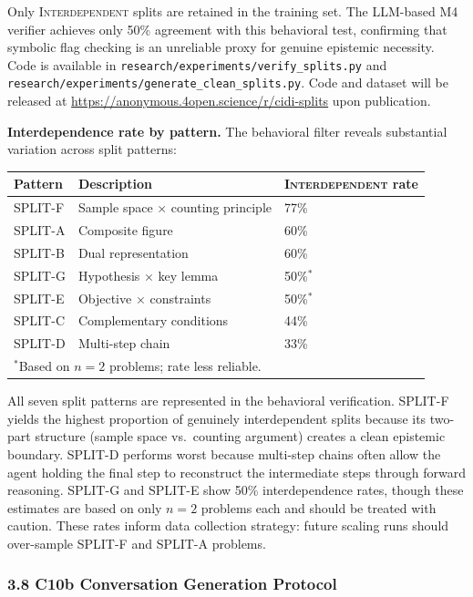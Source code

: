 \documentclass[
  11pt,
]{article}
\newcounter{none} %
\begin{document}
Only \textsc{Interdependent} splits are retained in the training set.
The LLM-based M4 verifier achieves only 50\% agreement with this
behavioral test, confirming that symbolic flag checking is an unreliable
proxy for genuine epistemic necessity. Code is available in
\texttt{research/experiments/verify\_splits.py} and
\texttt{research/experiments/generate\_clean\_splits.py}.
Code and dataset will be released at \url{https://anonymous.4open.science/r/cidi-splits} upon publication.

\textbf{Interdependence rate by pattern.} The behavioral filter reveals
substantial variation across split patterns:

{\def\LTcaptype{none}
\begin{longtable}[]{@{}lll@{}}
\toprule\noalign{}
Pattern & Description & \textsc{Interdependent} rate \\
\midrule\noalign{}
\endhead
\bottomrule\noalign{}
\endlastfoot
SPLIT-F & Sample space $\times$ counting principle & 77\% \\
SPLIT-A & Composite figure & 60\% \\
SPLIT-B & Dual representation & 60\% \\
SPLIT-G & Hypothesis $\times$ key lemma & 50\%$^*$ \\
SPLIT-E & Objective $\times$ constraints & 50\%$^*$ \\
SPLIT-C & Complementary conditions & 44\% \\
SPLIT-D & Multi-step chain & 33\% \\
\multicolumn{3}{l}{\footnotesize $^*$Based on $n=2$ problems; rate less reliable.} \\
\end{longtable}
}

All seven split patterns are represented in the behavioral verification.
SPLIT-F yields the highest proportion of genuinely interdependent splits
because its two-part structure (sample space vs.\ counting argument)
creates a clean epistemic boundary. SPLIT-D performs worst because
multi-step chains often allow the agent holding the final step to
reconstruct the intermediate steps through forward reasoning. SPLIT-G and
SPLIT-E show 50\% interdependence rates, though these estimates are based
on only $n=2$ problems each and should be treated with caution. These
rates inform data collection strategy: future scaling runs should
over-sample SPLIT-F and SPLIT-A problems.

\subsubsection{3.8 C10b Conversation Generation
Protocol}\label{c10b-protocol}
\end{document}
